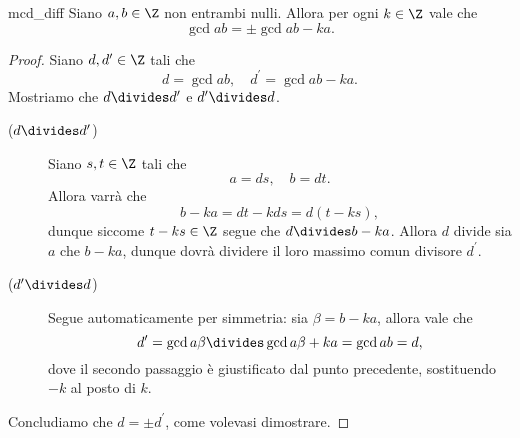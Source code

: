 \begin{lemma}{mcd_diff}
    Siano $a, b \in \Z$ non entrambi nulli. Allora per ogni $k \in \Z$ vale che \begin{equation}
        \gcd{a}{b} = \pm\gcd{a}{b-ka}.    
    \end{equation}
\end{lemma}
\begin{proof}
    Siano $d, d^\prime \in \Z$ tali che \[
        d = \gcd{a}{b}, \quad d^\prime = \gcd{a}{b-ka}.    
    \] Mostriamo che $d \divides d^\prime$ e $d^\prime \divides d$.

    \begin{description}
        \item[($d \divides d^\prime$)] Siano $s, t \in \Z$ tali che \[
            a = ds, \quad b = dt.    
        \] Allora varrà che \[
            b - ka = dt - kds = d(t - ks),    
        \] dunque siccome $t - ks \in \Z$ segue che $d \divides b - ka$.
        Allora $d$ divide sia $a$ che $b - ka$, dunque dovrà dividere il loro massimo comun divisore $d^\prime$.
        \item[($d^\prime \divides d$)] Segue automaticamente per simmetria: sia $\beta = b - ka$, allora vale che \[
            d^\prime = \gcd{a}{\beta} \divides \gcd{a}{\beta + ka} = \gcd{a}{b} = d,  
        \] dove il secondo passaggio è giustificato dal punto precedente, sostituendo $-k$ al posto di $k$.
    \end{description}
    Concludiamo che $d = \pm d^\prime$, come volevasi dimostrare.
\end{proof}

